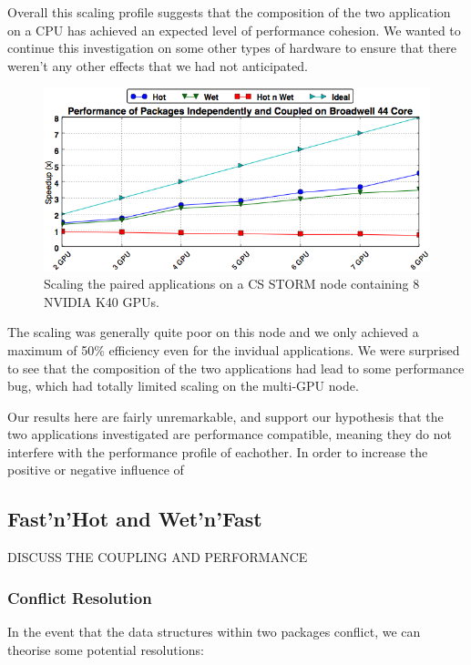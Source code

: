 \documentclass[runningheads,a4paper]{llncs}
\begin{document}
Overall this scaling profile suggests that the composition of the two application on a CPU has achieved an expected level of performance cohesion. We wanted to continue this investigation on some other types of hardware to ensure that there weren't any other effects that we had not anticipated.

\begin{figure}
\centering
\includegraphics[width=1.0\linewidth]{gpu_storm}
\caption{Scaling the paired applications on a CS STORM node containing 8 NVIDIA K40 GPUs.}
\label{fig:scaling-hot-wet-storm}
\end{figure}

The scaling was generally quite poor on this node and we only achieved a maximum of 50\% efficiency even for the invidual applications. We were surprised to see that the composition of the two applications had lead to some performance bug, which had totally limited scaling on the multi-GPU node.


Our results here are fairly unremarkable, and support our hypothesis that the two applications investigated are performance compatible, meaning they do not interfere with the performance profile of eachother. In order to increase the positive or negative influence of 

\subsection{Fast'n'Hot and Wet'n'Fast}

DISCUSS THE COUPLING AND PERFORMANCE

\subsubsection{Conflict Resolution}

In the event that the data structures within two packages conflict, we can theorise some potential resolutions:
\end{document}
